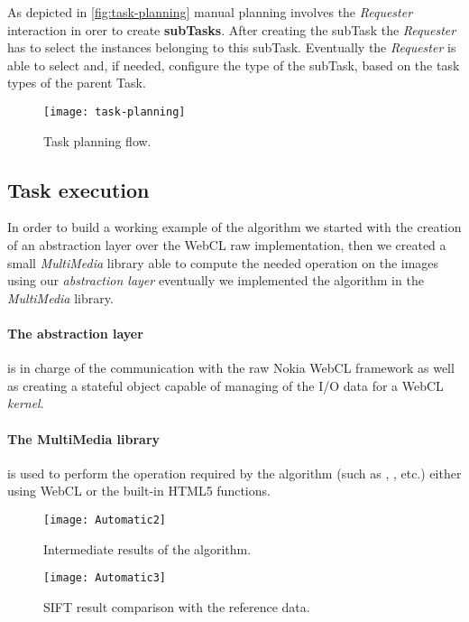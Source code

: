 As depicted in \autoref{fig:task-planning} manual planning involves the
\emph{Requester} interaction in orer to create \textbf{subTasks}. After creating
the subTask the \emph{Requester} has to select the instances belonging to this
subTask. Eventually the \emph{Requester} is able to select and, if needed,
configure the type of the subTask, based on the task types of the parent Task.
\begin{figure}[htb]
    \centering
    \texttt{[image: task-planning]}
    \caption{Task planning flow.}
    \label{fig:task-planning}
\end{figure}



\subsection{Task execution}









In order to build a working example of the algorithm we started with the creation
of an abstraction layer over the \ac{WebCL} raw implementation, then we created
a small \emph{MultiMedia} library able to compute the needed operation on the
images using our \emph{abstraction layer} eventually we implemented the algorithm
in the \emph{MultiMedia} library.

\paragraph{The abstraction layer} is in charge of the communication with the raw
Nokia WebCL framework as well as creating a stateful object capable of
managing of the I/O data for a WebCL \emph{kernel}.

\paragraph{The MultiMedia library} is used to perform the operation required by
the algorithm (such as , ,  etc.) either
using \ac{WebCL} or the built-in HTML5 functions.
\begin{figure}[htb]
    \centering
    \texttt{[image: Automatic2]}
    \caption{Intermediate results of the algorithm.}
    \label{fig:Automatic2}
\end{figure}

\begin{figure}[htb]
    \centering
    \texttt{[image: Automatic3]}
    \caption{\acs{SIFT} result comparison with the reference data.}
    \label{fig:Automatic3}
\end{figure}